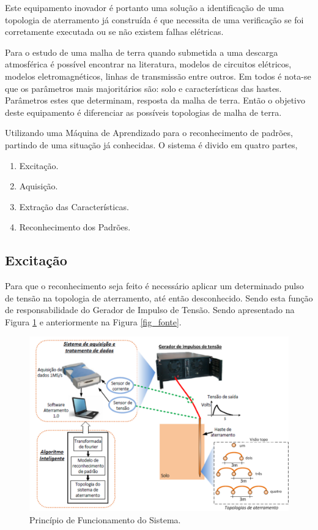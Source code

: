 \documentclass[a4paper, 10pt]{article}
\begin{document}
Este equipamento inovador é portanto uma solução a identificação de uma topologia
de aterramento já construída é que necessita de uma verificação se foi corretamente
executada ou se não existem falhas elétricas.

Para o estudo de uma malha de terra quando submetida a uma descarga atmosférica 
é possível encontrar na literatura, modelos de circuitos elétricos, modelos 
eletromagnéticos, linhas de transmissão entre outros. Em todos é nota-se 
que os parâmetros mais majoritários são: solo e características das hastes. 
Parâmetros estes que determinam, resposta da malha de terra. Então o objetivo
deste equipamento é diferenciar as possíveis topologias de malha de terra. 

Utilizando uma Máquina de Aprendizado para o reconhecimento de padrões, 
partindo de uma situação já conhecidas. O sistema é divido em quatro partes, 

\begin{enumerate}
    \item Excitação.
    \item Aquisição.
    \item Extração das Características.
    \item Reconhecimento dos Padrões.
\end{enumerate}

\subsection{Excitação}

Para que o reconhecimento seja feito é necessário aplicar um determinado pulso
de tensão na topologia de aterramento, até então desconhecido. 
Sendo esta função de responsabilidade do Gerador de Impulso de Tensão. 
Sendo apresentado na Figura \ref{fig_principio_funcionamento} e 
anteriormente na Figura \ref{fig_fonte}.

\begin{figure}[!h]
        \caption{\label{fig_principio_funcionamento}Princípio de Funcionamento do Sistema.}
	    \begin{center}
            \includegraphics[scale=0.3]{../fotos/principio/principio_de_funcionamento_corte.pdf}
	    \end{center}
\end{figure}
\end{document}
